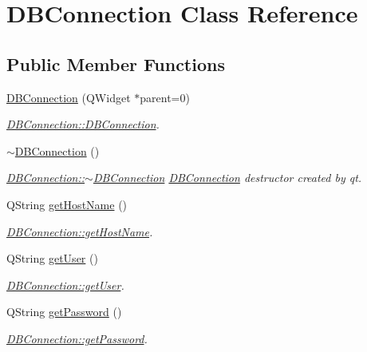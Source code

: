 \hypertarget{classDBConnection}{\section{D\-B\-Connection Class Reference}
\label{classDBConnection}
}
\subsection*{Public Member Functions}
\begin{DoxyCompactItemize}
\item 
\hyperlink{classDBConnection_a1b38e96a988c6d7f530bb3aa6a8fc3a8}{D\-B\-Connection} (Q\-Widget $\ast$parent=0)
\begin{DoxyCompactList}\small\item\em \hyperlink{classDBConnection_a1b38e96a988c6d7f530bb3aa6a8fc3a8}{D\-B\-Connection\-::\-D\-B\-Connection}. \end{DoxyCompactList}\item 
\hypertarget{classDBConnection_ae21031a13c223440f5af5c62dc4bc84c}{\hyperlink{classDBConnection_ae21031a13c223440f5af5c62dc4bc84c}{$\sim$\-D\-B\-Connection} ()}\label{classDBConnection_ae21031a13c223440f5af5c62dc4bc84c}

\begin{DoxyCompactList}\small\item\em \hyperlink{classDBConnection_ae21031a13c223440f5af5c62dc4bc84c}{D\-B\-Connection\-::$\sim$\-D\-B\-Connection} \hyperlink{classDBConnection}{D\-B\-Connection} destructor created by qt. \end{DoxyCompactList}\item 
Q\-String \hyperlink{classDBConnection_a6477ddffd0a1439ecf0dfed6ebf17c14}{get\-Host\-Name} ()
\begin{DoxyCompactList}\small\item\em \hyperlink{classDBConnection_a6477ddffd0a1439ecf0dfed6ebf17c14}{D\-B\-Connection\-::get\-Host\-Name}. \end{DoxyCompactList}\item 
Q\-String \hyperlink{classDBConnection_a9b68b9e34a5602f621f2208977f35d68}{get\-User} ()
\begin{DoxyCompactList}\small\item\em \hyperlink{classDBConnection_a9b68b9e34a5602f621f2208977f35d68}{D\-B\-Connection\-::get\-User}. \end{DoxyCompactList}\item 
Q\-String \hyperlink{classDBConnection_a44b98126e3511f201585a619f3dc2204}{get\-Password} ()
\begin{DoxyCompactList}\small\item\em \hyperlink{classDBConnection_a44b98126e3511f201585a619f3dc2204}{D\-B\-Connection\-::get\-Password}. \end{DoxyCompactList}\end{DoxyCompactItemize}


